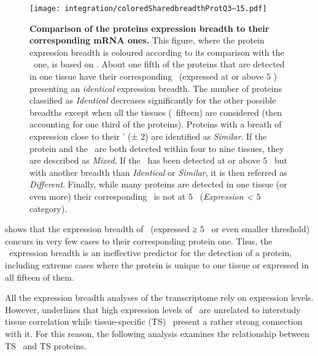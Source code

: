 \begin{figure}[!htpb]
    \texttt{[image: integration/coloredSharedbreadthProtQ3--15.pdf]}\centering
    \vspace{-4mm}
    \caption[Comparison of the proteins expression breadth to their
    corresponding mRNA ones]{\label{fig:SharedBreadthProtQ3}%
    \textbf{Comparison of the proteins expression breadth
    to their corresponding mRNA ones.}
    This figure, where the protein expression breadth is coloured
    according to its comparison with the \mRNA\ one,
    is based on .
    About one fifth of the proteins that are detected in one tissue
    have their corresponding \mRNA\ (expressed at or above $5$ \FPKM{})
    presenting an \emph{identical} expression breadth.
    The number of proteins classified as \emph{Identical} decreases significantly
    for the other possible breadths
    except when all the tissues (\ie\ fifteen) are considered
    (then accounting for one third of the proteins).
    Proteins with a breath of expression close to their \mRNAs{}' (± $2$)
    are identified as \emph{Similar}.
    If the protein and the \mRNA\ are both detected within four to nine tissues,
    they are described as \emph{Mixed}.
    If the \mRNA\ has been detected at or above $5$ \FPKM\
    but with another breadth than \emph{Identical} or \emph{Similar},
    it is then referred as \emph{Different}.
    Finally, while many proteins are detected in one tissue (or even more)
    their corresponding \mRNAs\ is not at $5$ \FPKM\
    (\emph{Expression < $5$ \FPKM} category).
    }
\end{figure}

 shows that the expression breadth
of \mRNAs\ (expressed ≥ $5$ \FPKM\ or even smaller threshold) concurs
in very few cases to their corresponding protein one.
Thus, the \mRNAs\ expression breadth is
an ineffective predictor for the detection of a protein,
including extreme cases where the protein is unique to one tissue
or expressed in all fifteen of them.


All the expression breadth analyses of the transcriptome rely on expression levels.
However,  underlines that
high expression levels of \mRNAs\ are unrelated to interstudy tissue correlation
while tissue-specific (\gls{TS}) \mRNAs\ present a rather strong connection with it.
For this reason, the following analysis examines
the relationship between \gls{TS} \mRNAs\ and \gls{TS} proteins.


